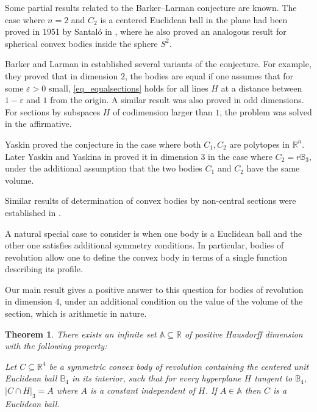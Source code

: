 \documentclass{amsart}
\def \R{\mathbb R}
\def \B{\mathbb B}
\newcommand \vol[2][3]{\left|#2\right|_{#1}}
\newtheorem{theorem}{Theorem}
\begin{document}
Some partial results related to the Barker--Larman conjecture are known.
The case where $n=2$ and $C_2$ is a centered Euclidean ball in the plane had been proved in 1951 by Santaló in \cite{santalo1951two}, where he also proved an analogous result for spherical convex bodies inside the sphere $S^2$.

Barker and Larman in \cite{barker2001} established several variants of the conjecture. For example, they proved that in dimension $2$, the bodies are equal if one assumes that for some $\varepsilon>0$ small, \eqref{eq_equalsections} holds for all lines $H$ at a distance between $1-\varepsilon$ and $1$ from the origin.
A similar result was also proved in odd dimensions.
For sections by subspaces $H$ of codimension larger than $1$, the problem was solved in the affirmative.

Yaskin \cite{yaskin2011unique} proved the conjecture in the case where both $C_1, C_2$ are polytopes in $\R^n$.
Later Yaskin and Yaskina in \cite{yaskin2015thick} proved it in dimension $3$ in the case where $C_2 = r \B_3$, under the additional assumption that the two bodies $C_1$ and $C_2$ have the same volume.

Similar results of determination of convex bodies by non-central sections were established in \cite{alfonseca2025characterizations, alfonseca2025croft, gardner2012problem, kurusa2015characterizations, nazarov2014asymmetric, yaskin2017non}.

A natural special case to consider is when one body is a Euclidean ball and the other one satisfies additional symmetry conditions.
In particular, bodies of revolution allow one to define the convex body in terms of a single function describing its profile.

Our main result gives a positive answer to this question for bodies of revolution in dimension $4$, under an additional condition on the value of the volume of the section, which is arithmetic in nature.

\begin{theorem}
	\label{thm_main}
	There exists an infinite set $\mathbb A \subseteq \R$ of positive Hausdorff dimension with the following property:

	Let $C \subseteq \R^4$ be a symmetric convex body of revolution containing the centered unit Euclidean ball $\B_4$ in its interior, such that for every hyperplane $H$ tangent to $\B_4$, $\vol[3]{C \cap H} = A$ where $A$ is a constant independent of $H$.
	If $A \in \mathbb A$ then $C$ is a Euclidean ball.
\end{theorem}
\end{document}
